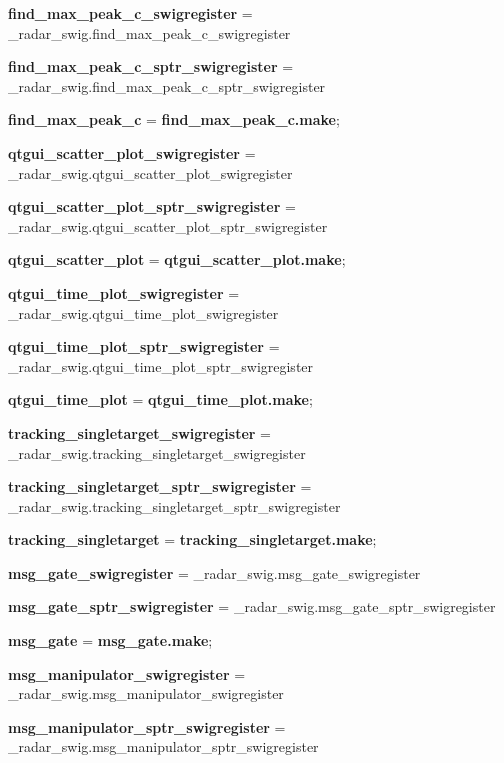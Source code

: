 \begin{DoxyCompactItemize}
\item 
{\bf find\+\_\+max\+\_\+peak\+\_\+c\+\_\+swigregister} = \+\_\+radar\+\_\+swig.\+find\+\_\+max\+\_\+peak\+\_\+c\+\_\+swigregister
\item 
{\bf find\+\_\+max\+\_\+peak\+\_\+c\+\_\+sptr\+\_\+swigregister} = \+\_\+radar\+\_\+swig.\+find\+\_\+max\+\_\+peak\+\_\+c\+\_\+sptr\+\_\+swigregister
\item 
{\bf find\+\_\+max\+\_\+peak\+\_\+c} = {\bf find\+\_\+max\+\_\+peak\+\_\+c.\+make};
\item 
{\bf qtgui\+\_\+scatter\+\_\+plot\+\_\+swigregister} = \+\_\+radar\+\_\+swig.\+qtgui\+\_\+scatter\+\_\+plot\+\_\+swigregister
\item 
{\bf qtgui\+\_\+scatter\+\_\+plot\+\_\+sptr\+\_\+swigregister} = \+\_\+radar\+\_\+swig.\+qtgui\+\_\+scatter\+\_\+plot\+\_\+sptr\+\_\+swigregister
\item 
{\bf qtgui\+\_\+scatter\+\_\+plot} = {\bf qtgui\+\_\+scatter\+\_\+plot.\+make};
\item 
{\bf qtgui\+\_\+time\+\_\+plot\+\_\+swigregister} = \+\_\+radar\+\_\+swig.\+qtgui\+\_\+time\+\_\+plot\+\_\+swigregister
\item 
{\bf qtgui\+\_\+time\+\_\+plot\+\_\+sptr\+\_\+swigregister} = \+\_\+radar\+\_\+swig.\+qtgui\+\_\+time\+\_\+plot\+\_\+sptr\+\_\+swigregister
\item 
{\bf qtgui\+\_\+time\+\_\+plot} = {\bf qtgui\+\_\+time\+\_\+plot.\+make};
\item 
{\bf tracking\+\_\+singletarget\+\_\+swigregister} = \+\_\+radar\+\_\+swig.\+tracking\+\_\+singletarget\+\_\+swigregister
\item 
{\bf tracking\+\_\+singletarget\+\_\+sptr\+\_\+swigregister} = \+\_\+radar\+\_\+swig.\+tracking\+\_\+singletarget\+\_\+sptr\+\_\+swigregister
\item 
{\bf tracking\+\_\+singletarget} = {\bf tracking\+\_\+singletarget.\+make};
\item 
{\bf msg\+\_\+gate\+\_\+swigregister} = \+\_\+radar\+\_\+swig.\+msg\+\_\+gate\+\_\+swigregister
\item 
{\bf msg\+\_\+gate\+\_\+sptr\+\_\+swigregister} = \+\_\+radar\+\_\+swig.\+msg\+\_\+gate\+\_\+sptr\+\_\+swigregister
\item 
{\bf msg\+\_\+gate} = {\bf msg\+\_\+gate.\+make};
\item 
{\bf msg\+\_\+manipulator\+\_\+swigregister} = \+\_\+radar\+\_\+swig.\+msg\+\_\+manipulator\+\_\+swigregister
\item 
{\bf msg\+\_\+manipulator\+\_\+sptr\+\_\+swigregister} = \+\_\+radar\+\_\+swig.\+msg\+\_\+manipulator\+\_\+sptr\+\_\+swigregister

\end{DoxyCompactItemize}

